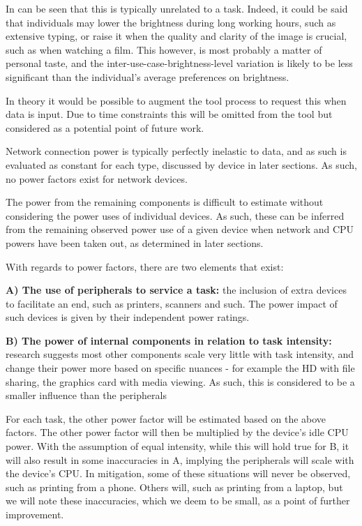 \documentclass[conference]{IEEEtran}
\begin{document}
In can be seen that this is typically unrelated to a task. Indeed, it
could be said that individuals may lower the brightness during long
working hours, such as extensive typing, or raise it when the quality
and clarity of the image is crucial, such as when watching a
film. This however, is most probably a matter of personal taste, and
the inter-use-case-brightness-level variation is likely to be less
significant than the individual’s average preferences on brightness.

In theory it would be possible to augment the tool process to request
this when data is input. Due to time constraints this will be omitted
from the tool but considered as a potential point of future work.


Network connection power is typically perfectly inelastic to data, and
as such is evaluated as constant for each type, discussed by device in
later sections. As such, no power factors exist for network devices.


The power from the remaining components is difficult to estimate
without considering the power uses of individual devices. As such,
these can be inferred from the remaining observed power use of a given
device when network and CPU powers have been taken out, as determined
in later sections.

With regards to power factors, there are two elements that exist:

{\textbf{A) The use of peripherals to service a task:}} the inclusion of extra
devices to facilitate an end, such as printers, scanners and such. The
power impact of such devices is given by their independent power
ratings.

{\textbf{B) The power of internal components in relation to task
    intensity:}} research suggests most other components scale very little with task
intensity, and change their power more based on specific nuances - for
example the HD with file sharing, the graphics card with media
viewing. As such, this is considered to be a smaller influence than
the peripherals

For each task, the other power factor will be estimated based on the
above factors. The other power factor will then be multiplied by the
device’s idle CPU power. With the assumption of equal intensity, while
this will hold true for B, it will also result in some inaccuracies in
A, implying the peripherals will scale with the device’s CPU. In
mitigation, some of these situations will never be observed, such as
printing from a phone. Others will, such as printing from a laptop,
but we will note these inaccuracies, which we deem to be small, as a
point of further improvement.
\end{document}
